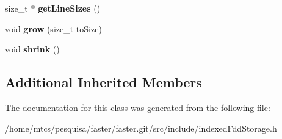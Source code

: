 \begin{DoxyCompactItemize}
\item 
\hypertarget{classfaster_1_1indexedFddStorage_3_01K_00_01T_01_5_01_4_a43dbd5e349f514d6fc6875bc400d3061}{}size\+\_\+t $\ast$ {\bfseries get\+Line\+Sizes} ()\label{classfaster_1_1indexedFddStorage_3_01K_00_01T_01_5_01_4_a43dbd5e349f514d6fc6875bc400d3061}

\item 
\hypertarget{classfaster_1_1indexedFddStorage_3_01K_00_01T_01_5_01_4_a47a8f1370e5b9c5a5cff40e77b241731}{}void {\bfseries grow} (size\+\_\+t to\+Size)\label{classfaster_1_1indexedFddStorage_3_01K_00_01T_01_5_01_4_a47a8f1370e5b9c5a5cff40e77b241731}

\item 
\hypertarget{classfaster_1_1indexedFddStorage_3_01K_00_01T_01_5_01_4_a69e570aeb85d7e3f8e3d2878773e9567}{}void {\bfseries shrink} ()\label{classfaster_1_1indexedFddStorage_3_01K_00_01T_01_5_01_4_a69e570aeb85d7e3f8e3d2878773e9567}

\end{DoxyCompactItemize}
\subsection*{Additional Inherited Members}


The documentation for this class was generated from the following file\+:\begin{DoxyCompactItemize}
\item 
/home/mtcs/pesquisa/faster/faster.\+git/src/include/indexed\+Fdd\+Storage.\+h\end{DoxyCompactItemize}
